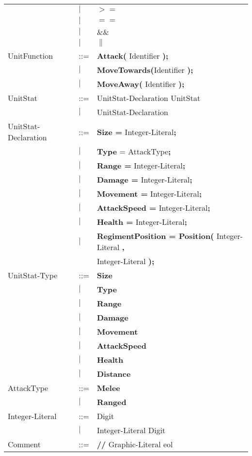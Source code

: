 \begin{center}
\begin{longtable}{l l p{7cm}}
							&$\mid$	&$\boldsymbol {>=}$\\
							&$\mid$	&$\boldsymbol {==}$\\
							&$\mid$	&$\boldsymbol {\&\&}$\\
							&$\mid$	&$\boldsymbol {\|}$\\
UnitFunction				&	::=	&{\bf Attack(} Identifier {\bf );} \\
							&$\mid$	&{\bf MoveTowards(}Identifier {\bf );} \\
							&$\mid$	&{\bf MoveAway(} Identifier {\bf );} \\
UnitStat					&	::=	&UnitStat-Declaration UnitStat \\
							&$\mid$	&UnitStat-Declaration \\
UnitStat-Declaration		&	::=	&{\bf Size =} Integer-Literal{\bf ;} \\
							&$\mid$	&{\bf Type} = AttackType{\bf ;}\\
							&$\mid$	&{\bf  Range =} Integer-Literal{\bf;}\\
							&$\mid$	&{\bf Damage =} Integer-Literal{\bf ;}\\
							&$\mid$	&{\bf Movement = }Integer-Literal{\bf ;} \\				  
							&$\mid$	&{\bf AttackSpeed = }Integer-Literal{\bf ;} \\				  
							&$\mid$	&{\bf Health = }Integer-Literal{\bf ;} \\				  
							&$\mid$	& {\bf RegimentPosition = Position(} Integer-Literal {\bf ,}\\
							&		& Integer-Literal {\bf );}\\
UnitStat-Type				&	::=	&{\bf Size}\\
							&$\mid$	&{\bf Type}\\
							&$\mid$	&{\bf Range}\\
							&$\mid$	&{\bf Damage}\\
							&$\mid$	&{\bf Movement}\\
							&$\mid$	&{\bf AttackSpeed}\\
							&$\mid$	&{\bf Health}\\
							&$\mid$	&{\bf Distance}\\
AttackType					&	::=	&{\bf Melee}\\
							&$\mid$	&{\bf Ranged}\\
Integer-Literal				&	::=	&Digit\\
							&$\mid$	&Integer-Literal Digit\\
Comment						&	::=	&{\bf //} Graphic-Literal eol\\

\end{longtable}
\end{center}
